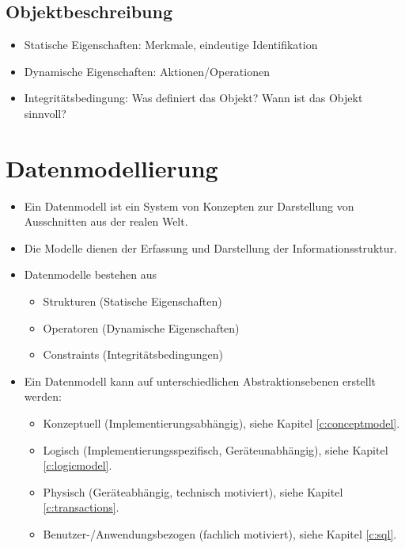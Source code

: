 		\subsection{Objektbeschreibung} %
			\begin{itemize}
				\item Statische Eigenschaften: Merkmale, eindeutige Identifikation
				\item Dynamische Eigenschaften: Aktionen/Operationen
				\item Integritätsbedingung: Was definiert das Objekt? Wann ist das Objekt sinnvoll?
			\end{itemize}

	\section{Datenmodellierung} %
		\begin{itemize}
			\item Ein Datenmodell ist ein System von Konzepten zur Darstellung von Ausschnitten aus der realen Welt.
			\item Die Modelle dienen der Erfassung und Darstellung der Informationsstruktur.
			\item Datenmodelle bestehen aus
				\begin{itemize}
					\item Strukturen (Statische Eigenschaften)
					\item Operatoren (Dynamische Eigenschaften)
					\item Constraints (Integritätsbedingungen)
				\end{itemize}
			\item Ein Datenmodell kann auf unterschiedlichen Abstraktionsebenen erstellt werden:
				\begin{itemize}
					\item Konzeptuell (Implementierungsabhängig), siehe Kapitel \ref{c:conceptmodel}.
					\item Logisch (Implementierungsspezifisch, Geräteunabhängig), siehe Kapitel \ref{c:logicmodel}.
					\item Physisch (Geräteabhängig, technisch motiviert), siehe Kapitel \ref{c:transactions}.
					\item Benutzer-/Anwendungsbezogen (fachlich motiviert), siehe Kapitel \ref{c:sql}.
				\end{itemize}
		\end{itemize}


